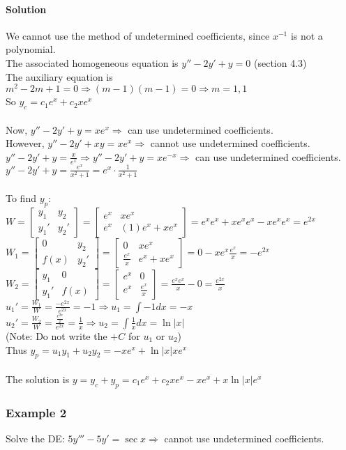 \documentclass{article}
\newcommand{\mat}[4]{\begin{bmatrix} #1 & #2 \\ #3 & #4 \end{bmatrix}}
\begin{document}
\paragraph{Solution} We cannot use the method of undetermined coefficients, since $x^{-1}$ is not a polynomial.
\\The associated homogeneous equation is $y''-2y'+y=0$ (section 4.3)
\\The auxiliary equation is $m^2-2m+1=0\Rightarrow(m-1)(m-1)=0\Rightarrow m=1,1$
\\So $y_c=c_1e^x+c_2xe^x$
\\\\Now, $y''-2y'+y=xe^x\Rightarrow$ can use undetermined coefficients.
\\However, $y''-2y'+xy=xe^x\Rightarrow$ cannot use undetermined coefficients.
\\$y''-2y'+y=\frac{x}{e^x}\Rightarrow y''-2y'+y=xe^{-x}\Rightarrow$ can use undetermined coefficients.
\\$y''-2y'+y=\frac{e^x}{x^2+1}=e^{x}\cdot\frac{1}{x^2+1}$
\\\\To find $y_p$: $W=\mat{y_1}{y_2}{y_1'}{y_2'}=\mat{e^x}{xe^x}{e^x}{(1)e^x+xe^x}=e^xe^x+xe^xe^x-xe^xe^x=e^{2x}$
\\$W_1=\mat{0}{y_2}{f(x)}{y_2'}=\mat{0}{xe^x}{\frac{e^x}{x}}{e^x+xe^x}=0-xe^x\frac{e^x}{x}=-e^{2x}$
\\$W_2=\mat{y_1}{0}{y_1'}{f(x)}=\mat{e^x}{0}{e^x}{\frac{e^x}{x}}=\frac{e^xe^x}{x}-0=\frac{e^{2x}}{x}$
\\$u_1'=\frac{W_1}{W}=\frac{-e^{2x}}{e^{2x}}=-1\Rightarrow u_1=\int-1dx=-x$
\\$u_2'=\frac{W_2}{W}=\frac{\frac{e^{2x}}{x}}{e^{2x}}=\frac{1}{x}\Rightarrow u_2=\int\frac{1}{x}dx=\ln|x|$
\\(Note: Do not write the $+C$ for $u_1$ or $u_2$)
\\Thus $y_p=u_1y_1+u_2y_2=-xe^x+\ln|x|xe^x$
\\\\The solution is $y=y_c+y_p=c_1e^x+c_2xe^x-xe^x+x\ln|x|e^x$

\newpage\subsubsection{Example 2}
Solve the DE: $5y'''-5y'=\sec x\Rightarrow$ cannot use undetermined coefficients.
\end{document}
